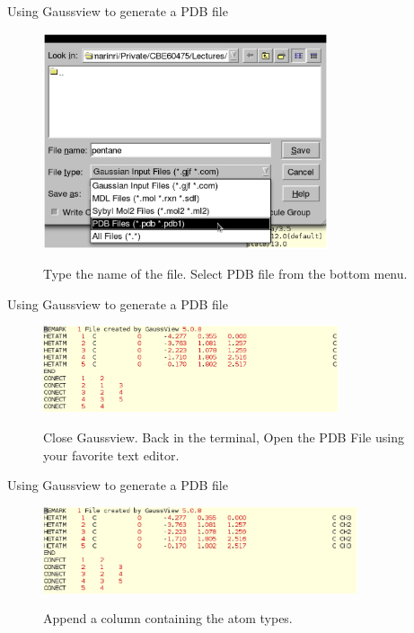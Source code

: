 \documentclass{beamer}
\begin{document}
\begin{frame}{Using Gaussview to generate a PDB file}
\begin{figure}
\begin{center}
\includegraphics[height=2.5in]{gaussian9final.eps}
\end{center}
Type the name of the file. Select PDB file from the bottom menu.
\end{figure}
\end{frame}
\begin{frame}{Using Gaussview to generate a PDB file}
\begin{figure}
\begin{center}
\includegraphics[height=1in]{pdbfile_final.eps}
\end{center}
Close Gaussview. Back in the terminal, Open the PDB File using your favorite text editor.
\end{figure}
\end{frame}
\begin{frame}{Using Gaussview to generate a PDB file}
\begin{figure}
\begin{center}
\includegraphics[height=1in]{pdbfile_edited_final.eps}
\end{center}
Append a column containing the atom types.
\end{figure}
\end{frame}
\end{document}
